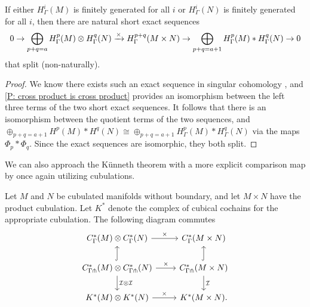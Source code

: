 \begin{theorem}\label{T: cohomology kunneth}
	If either $H^i_\Gamma(M)$ is finitely generated for all $i$ or $H^i_\Gamma(N)$ is finitely generated for all $i$, then there are natural short exact sequences
	\[
	0 \to \bigoplus_{p+q = a}H^p_\Gamma(M) \otimes H^q_\Gamma(N) \xrightarrow{\times} H^{p+q}_\Gamma(M \times N) \to \bigoplus_{p+q = a+1}H^p_\Gamma(M)* H^q_\Gamma(N) \to 0
	\]
	that split (non-naturally).
\end{theorem}

\begin{proof}
	We know there exists such an exact sequence in singular cohomology \cite[Theorem 60.5]{Mun84}, and \cref{P: cross product is cross product} provides an isomorphism between the left three terms of the two short exact sequences.
	It follows that there is an isomorphism between the quotient terms of the two sequences, and $\oplus_{p+q = a+1}H^p(M)* H^q(N) \cong \oplus_{p+q = a+1}H^p_\Gamma(M)* H^q_\Gamma(N)$ via the maps $\Phi_p*\Phi_q$.
	Since the exact sequences are isomorphic, they both split.
\end{proof}

We can also approach the K\"unneth theorem with a more explicit comparison map by once again utilizing cubulations.

\begin{proposition}\label{P: cross product comparison}
	Let $M$ and $N$ be cubulated manifolds without boundary, and let $M \times N$ have the product cubulation.
	Let $K^*$ denote the complex of cubical cochains for the appropriate cubulation.
	The following diagram commutes
	\[
	\begin{tikzcd}
		C^*_{\Gamma}(M) \otimes C^*_{\Gamma}(N) \arrow{r}{\times} & C^*_{\Gamma}(M \times N) \\
		C^*_{\Gamma\pf}(M) \otimes C^*_{\Gamma\pf}(N) \arrow{r}{\times} \arrow[u, hook] \arrow[d, "\mc I \otimes \mc I"] & C^*_{\Gamma\pf}(M \times N) \arrow[u, hook] \arrow[d, "\mc I"] \\
		K^*(M) \otimes K^*(N) \arrow{r}{\times} & K^*(M \times N).
	\end{tikzcd}
	\]
\end{proposition}

